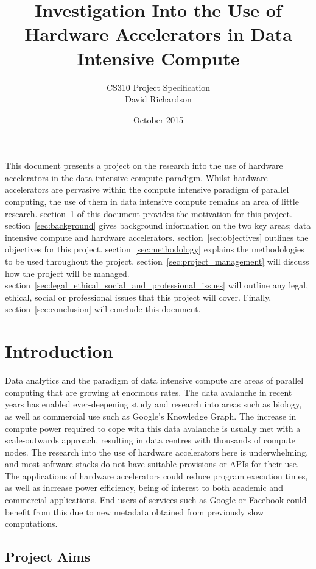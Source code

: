 \documentclass[12pt,a4paper]{article}
\title{Investigation Into the Use of Hardware Accelerators in Data Intensive Compute}
\author{CS310 Project Specification\\David Richardson}
\date{October 2015}
\begin{document}
	\maketitle

	This document presents a project on the research into the use of hardware accelerators in the data intensive compute paradigm. Whilst hardware accelerators are pervasive within the compute intensive paradigm of parallel computing, the use of them in data intensive compute remains an area of little research. section~\ref{sec:introduction} of this document provides the motivation for this project. section~\ref{sec:background} gives background information on the two key areas; data intensive compute and hardware accelerators. section~\ref{sec:objectives} outlines the objectives for this project. section~\ref{sec:methodology} explains the methodologies to be used throughout the project. section~\ref{sec:project_management} will discuss how the project will be managed. section~\ref{sec:legal_ethical_social_and_professional_issues} will outline any legal, ethical, social or professional issues that this project will cover. Finally, section~\ref{sec:conclusion} will conclude this document.

	\section{Introduction} %
	\label{sec:introduction}

		Data analytics and the paradigm of data intensive compute are areas of parallel computing that are growing at enormous rates. The data avalanche in recent years has enabled ever-deepening study and research into areas such as biology, as well as commercial use such as Google's Knowledge Graph. The increase in compute power required to cope with this data avalanche is usually met with a scale-outwards approach, resulting in data centres with thousands of compute nodes. The research into the use of hardware accelerators here is underwhelming, and most software stacks do not have suitable provisions or APIs for their use. The applications of hardware accelerators could reduce program execution times, as well as increase power efficiency, being of interest to both academic and commercial applications. End users of services such as Google or Facebook could benefit from this due to new metadata obtained from previously slow computations.

		\subsection{Project Aims} %
		\label{sub:project_aims}
\end{document}
